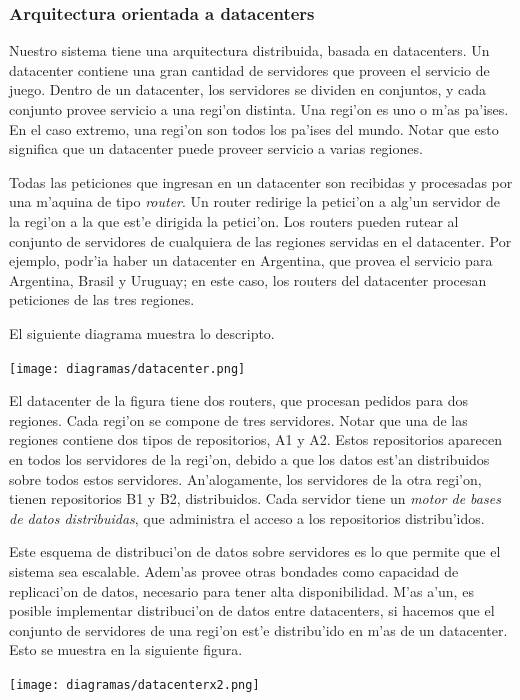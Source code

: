 \subsubsection{Arquitectura orientada a datacenters}

Nuestro sistema tiene una arquitectura distribuida, basada en datacenters. Un datacenter contiene una gran cantidad de servidores que proveen el servicio de juego. Dentro de un datacenter, los servidores se dividen en conjuntos, y cada conjunto provee servicio a una regi'on distinta. Una regi'on es uno o m'as pa'ises. En el caso extremo, una regi'on son todos los pa'ises del mundo. Notar que esto significa que un datacenter puede proveer servicio a varias regiones.

Todas las peticiones que ingresan en un datacenter son recibidas y procesadas por una m'aquina de tipo \textit{router}. Un router redirige la petici'on a alg'un servidor de la regi'on a la que est'e dirigida la petici'on. Los routers pueden rutear al conjunto de servidores de cualquiera de las regiones servidas en el datacenter. Por ejemplo, podr'ia haber un datacenter en Argentina, que provea el servicio para Argentina, Brasil y Uruguay; en este caso, los routers del datacenter procesan peticiones de las tres regiones.

El siguiente diagrama muestra lo descripto. 

\texttt{[image: diagramas/datacenter.png]}

\noindent
El datacenter de la figura tiene dos routers, que procesan pedidos para dos regiones. Cada regi'on se compone de tres servidores. Notar que una de las regiones contiene dos tipos de repositorios, A1 y A2. Estos repositorios aparecen en todos los servidores de la regi'on, debido a que los datos est'an distribuidos sobre todos estos servidores. An'alogamente, los servidores de la otra regi'on, tienen repositorios B1 y B2, distribuidos. Cada servidor tiene un \textit{motor de bases de datos distribuidas}, que administra el acceso a los repositorios distribu'idos.

Este esquema de distribuci'on de datos sobre servidores es lo que permite que el sistema sea escalable. Adem'as provee otras bondades como capacidad de replicaci'on de datos, necesario para tener alta disponibilidad. M'as a'un, es posible implementar distribuci'on de datos entre datacenters, si hacemos que el conjunto de servidores de una regi'on est'e distribu'ido en m'as de un datacenter. Esto se muestra en la siguiente figura.

\texttt{[image: diagramas/datacenterx2.png]}

